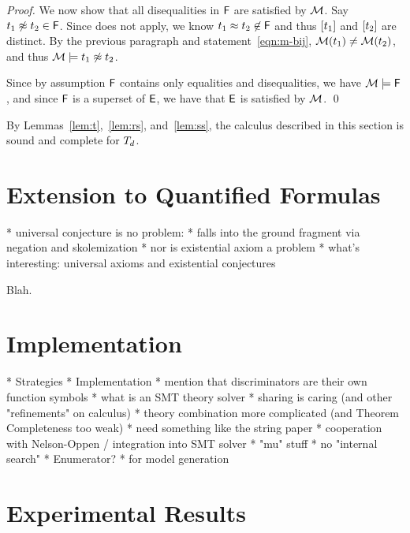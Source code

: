 \begin{proof}
We now show that all disequalities in $\mathsf{F}$ are satisfied by $\mathcal{M}$.
Say $t_1 \not\approx t_2 \in \mathsf{F}$.
Since  does not apply, we know $t_1 \approx t_2 \not\in \mathsf{F}$ and thus $[ t_1 ]$ and $[ t_2 ]$ are distinct.
By the previous paragraph and statement~\ref{eqn:m-bij}, $\mathcal{M}( t_1 ) \neq \mathcal{M}( t_2 )$, and thus $\mathcal{M} \models t_1 \not\approx t_2$.

Since by assumption $\mathsf{F}$ contains only equalities and disequalities, we have $\mathcal{M} \models \mathsf{F}$,
and since $\mathsf{F}$ is a superset of $\mathsf{E}$, we have that $\mathsf{E}$ is satisfied by $\mathcal{M}$.
\qed
\end{proof}

By Lemmas~\ref{lem:t},~\ref{lem:rs}, and~\ref{lem:ss}, the calculus described in this section is sound and complete for $T_{d}$.

\section{Extension to Quantified Formulas}
\label{sec:extension-to-quantified-formulas}

  * universal conjecture is no problem:
    * falls into the ground fragment via negation
      and skolemization
  * nor is existential axiom a problem
  * what's interesting: universal axioms and existential conjectures

Blah.

\section{Implementation}
\label{sec:the-theory-solver}

  * Strategies
  * Implementation
    * mention that discriminators are their own function symbols
    * what is an SMT theory solver
    * sharing is caring (and other "refinements" on calculus)
    * theory combination more complicated (and Theorem Completeness too weak)
      * need something like the string paper
    * cooperation with Nelson-Oppen / integration into SMT solver
    * "mu" stuff
    * no "internal search"
  * Enumerator?
    * for model generation


\section{Experimental Results}
\label{sec:experimental-results}

